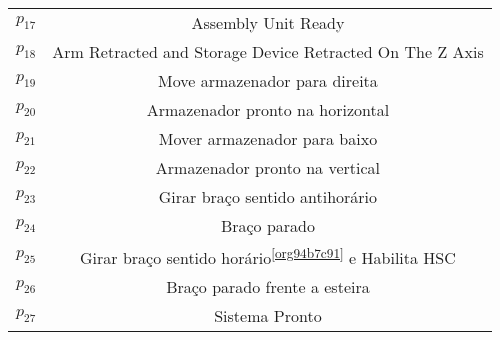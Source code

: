 \begin{table}[htbp]
\begin{tabular}{c|c}
\hyperlink{partialNet:p17}{\hypertarget{partialTable:p17}{$p_{17}$}} & Assembly Unit Ready\\
\hyperlink{partialNet:p18}{\hypertarget{partialTable:p18}{$p_{18}$}} & Arm Retracted and Storage Device Retracted On The Z Axis\\
\hyperlink{partialNet:p19}{\hypertarget{partialTable:p19}{$p_{19}$}} & Move armazenador para direita\\
\hyperlink{partialNet:p20}{\hypertarget{partialTable:p20}{$p_{20}$}} & Armazenador pronto na horizontal\\
\hyperlink{partialNet:p21}{\hypertarget{partialTable:p21}{$p_{21}$}} & Mover armazenador para baixo\\
\hyperlink{partialNet:p22}{\hypertarget{partialTable:p22}{$p_{22}$}} & Armazenador pronto na vertical\\
\hyperlink{partialNet:p23}{\hypertarget{partialTable:p23}{$p_{23}$}} & Girar braço sentido antihorário\footnotemark\\
\hyperlink{partialNet:p24}{\hypertarget{partialTable:p24}{$p_{24}$}} & Braço parado\\
\hyperlink{partialNet:p25}{\hypertarget{partialTable:p25}{$p_{25}$}} & Girar braço sentido horário\textsuperscript{\ref{org94b7c91}} e Habilita HSC\\
\hyperlink{partialNet:p26}{\hypertarget{partialTable:p26}{$p_{26}$}} & Braço parado frente a esteira\\
\hyperlink{partialNet:p27}{\hypertarget{partialTable:p27}{$p_{27}$}} & Sistema Pronto\\
\end{tabular}
\end{table}

